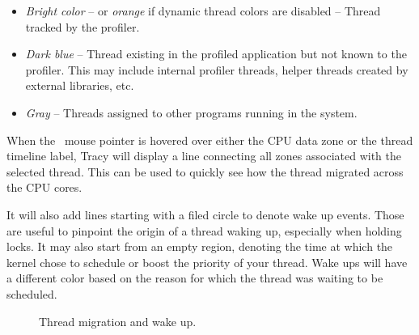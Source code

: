 \documentclass[hidelinks,titlepage,a4paper,twoside]{article}
\begin{document}
\begin{itemize}
\item \emph{Bright color} -- or \emph{orange} if dynamic thread colors are disabled -- Thread tracked by the profiler.
\item \emph{Dark blue} -- Thread existing in the profiled application but not known to the profiler. This may include internal profiler threads, helper threads created by external libraries, etc.
\item \emph{Gray} -- Threads assigned to other programs running in the system.
\end{itemize}

When the \faMousePointer{}~mouse pointer is hovered over either the CPU data zone or the thread timeline label, Tracy will display a line connecting all zones associated with the selected thread. This can be used to quickly see how the thread migrated across the CPU cores. 

It will also add lines starting with a filed circle to denote wake up events. Those are useful to pinpoint the origin of a thread waking up, especially when holding locks. It may also start from an empty region, denoting the time at which the kernel chose to schedule or boost the priority of your thread. Wake ups will have a different color based on the reason for which the thread was waiting to be scheduled.

\begin{figure}[h]
	\centering{}
	\caption{Thread migration and wake up.}
	\label{plot}
\end{figure}
\end{document}
